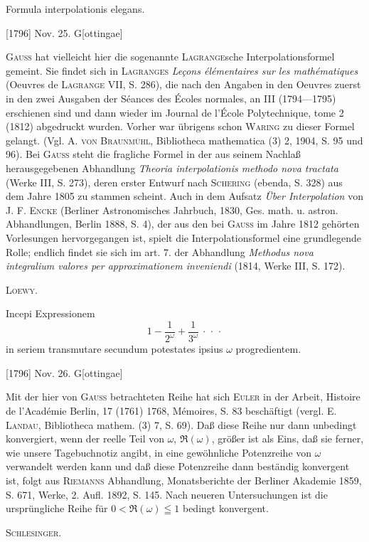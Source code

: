 \clearpage{}
\indent Formula interpolationis elegans.
\par\noindent\hfill[1796] Nov. 25. G[ottingae]

\medskip\begingroup\small
\indent \textsc{Gauss} hat vielleicht hier die sogenannte \textsc{Lagrange}sche Interpolationsformel gemeint. Sie findet sich in \textsc{Lagranges} \textit{Leçons élémentaires sur les mathématiques} (Oeuvres de \textsc{Lagrange} VII, S. 286), die nach den Angaben in den Oeuvres zuerst in den zwei Ausgaben der Séances des Écoles normales, an III (1794—1795) erschienen sind und dann wieder im Journal de l’École Polytechnique, tome 2 (1812) abgedruckt wurden. Vorher war übrigens schon \textsc{Waring} zu dieser Formel gelangt. (Vgl. A. \textsc{von Braunmühl}, Bibliotheca mathematica (3) 2, 1904, S. 95 und 96). Bei \textsc{Gauss} steht die fragliche Formel in der aus seinem Nachlaß herausgegebenen Abhandlung \textit{Theoria interpolationis methodo nova tractata} (Werke III, S. 273), deren erster Entwurf nach \textsc{Schering} (ebenda, S. 328) aus dem Jahre 1805 zu stammen scheint. Auch in dem Aufsatz \textit{Über Interpolation} von J. F. \textsc{Encke} (Berliner Astronomisches Jahrbuch, 1830, Ges. math. u. astron. Abhandlungen, Berlin 1888, S. 4), der aus den bei \textsc{Gauss} im Jahre 1812 gehörten Vorlesungen hervorgegangen ist, spielt die Interpolationsformel eine grundlegende Rolle; endlich findet sie sich im art. 7. der Abhandlung \textit{Methodus nova integralium valores per approximationem inveniendi} (1814, Werke III, S. 172).
\par\noindent\hfill\textsc{Loewy.}
\par\endgroup

\indent Incepi Expressionem
\[
1-\frac1{2^\omega}+\frac1{3^\omega}\ \cdotp\,\cdotp\,\cdotp
\]
\noindent in seriem transmutare secundum potestates ipsius \(\omega\) progredientem.
\par\noindent\hfill[1796] Nov. 26. G[ottingae]

\medskip\begingroup\small
\indent Mit der hier von \textsc{Gauss} betrachteten Reihe hat sich \textsc{Euler} in der Arbeit, Histoire de l’Académie Berlin, 17 (1761) 1768, Mémoires, S. 83 beschäftigt (vergl. E. \textsc{Landau}, Bibliotheca mathem. (3) 7, S. 69). Daß diese Reihe nur dann unbedingt konvergiert, wenn der reelle Teil von \(\omega\), \(\Re(\omega)\), größer ist als Eins, daß sie ferner, wie unsere Tagebuchnotiz angibt, in eine gewöhnliche Potenzreihe von \(\omega\) verwandelt werden kann und daß diese Potenzreihe dann beständig konvergent ist, folgt aus \textsc{Riemanns} Abhandlung, Monatsberichte der Berliner Akademie 1859, S. 671, Werke, 2. Aufl. 1892, S. 145. Nach neueren Untersuchungen ist die ursprüngliche Reihe für \(0<\Re(\omega)\leqq1\) bedingt konvergent.
\par\noindent\hfill\textsc{Schlesinger.}
\par\endgroup

